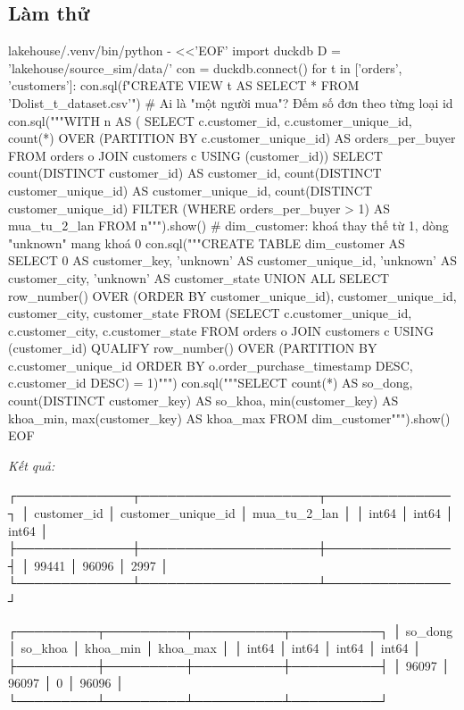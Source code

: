 \subsection{Làm thử}

\begin{codeblock}
lakehouse/.venv/bin/python - <<'EOF'
import duckdb
D = 'lakehouse/source_sim/data/'
con = duckdb.connect()
for t in ['orders', 'customers']:
    con.sql(f"CREATE VIEW {t} AS SELECT * FROM '{D}olist_{t}_dataset.csv'")
# Ai là "một người mua"? Đếm số đơn theo từng loại id
con.sql("""WITH n AS (
             SELECT c.customer_id, c.customer_unique_id, count(*) OVER
                      (PARTITION BY c.customer_unique_id) AS orders_per_buyer
             FROM orders o JOIN customers c USING (customer_id))
           SELECT count(DISTINCT customer_id)        AS customer_id,
                  count(DISTINCT customer_unique_id) AS customer_unique_id,
                  count(DISTINCT customer_unique_id)
                    FILTER (WHERE orders_per_buyer > 1) AS mua_tu_2_lan
           FROM n""").show()
# dim_customer: khoá thay thế từ 1, dòng "unknown" mang khoá 0
con.sql("""CREATE TABLE dim_customer AS
  SELECT 0 AS customer_key, 'unknown' AS customer_unique_id,
         'unknown' AS customer_city, 'unknown' AS customer_state
  UNION ALL
  SELECT row_number() OVER (ORDER BY customer_unique_id), customer_unique_id,
         customer_city, customer_state
  FROM (SELECT c.customer_unique_id, c.customer_city, c.customer_state
        FROM orders o JOIN customers c USING (customer_id)
        QUALIFY row_number() OVER (PARTITION BY c.customer_unique_id
                ORDER BY o.order_purchase_timestamp DESC,
                         c.customer_id DESC) = 1)""")
con.sql("""SELECT count(*) AS so_dong, count(DISTINCT customer_key) AS so_khoa,
                  min(customer_key) AS khoa_min, max(customer_key) AS khoa_max
           FROM dim_customer""").show()
EOF
\end{codeblock}
\textit{Kết quả:}
\begin{codeblock}
┌─────────────┬────────────────────┬──────────────┐
│ customer_id │ customer_unique_id │ mua_tu_2_lan │
│    int64    │       int64        │    int64     │
├─────────────┼────────────────────┼──────────────┤
│       99441 │              96096 │         2997 │
└─────────────┴────────────────────┴──────────────┘

┌─────────┬─────────┬──────────┬──────────┐
│ so_dong │ so_khoa │ khoa_min │ khoa_max │
│  int64  │  int64  │  int64   │  int64   │
├─────────┼─────────┼──────────┼──────────┤
│   96097 │   96097 │        0 │    96096 │
└─────────┴─────────┴──────────┴──────────┘
\end{codeblock}


